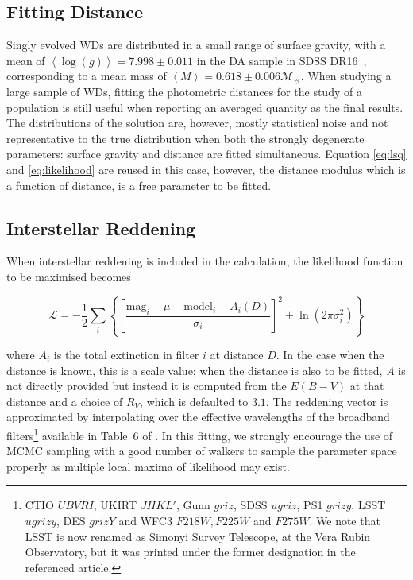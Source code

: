 \documentclass[fleqn,usenatbib]{rasti}
\newcommand{\msun}{\mathcal{M}_{\sun}}
\begin{document}
\subsection{Fitting Distance}
Singly evolved WDs are distributed in a small range of surface gravity, with a
mean of $\left<\log(g)\right> = 7.998 \pm 0.011$ in the DA sample in SDSS
DR16~\citep{2021MNRAS.507.4646K}, corresponding to a mean mass of
$\left<M\right> = 0.618 \pm 0.006 \msun$. When studying a large sample of WDs,
fitting the photometric distances for the study of a population is still
useful when reporting an averaged quantity as the final results. The
distributions of the solution are, however, mostly statistical noise and not
representative to the true distribution when both the strongly degenerate
parameters: surface gravity and distance are fitted simultaneous. Equation
\ref{eq:lsq} and \ref{eq:likelihood} are reused in this case, however, the
distance modulus which is a function of distance, is a free parameter to be
fitted.

\subsection{Interstellar Reddening}
When interstellar reddening is included in the calculation, the likelihood
function to be maximised becomes

\begin{equation}
    \mathcal{L} = -\dfrac{1}{2} \sum_{i} \left\{ \left[ \dfrac{\mathrm{mag}_i - \mu - \mathrm{model}_i - A_i(D)}{\sigma_i} \right]^2 + \ln(2\pi\sigma_i^2) \right\}
\end{equation}

where $A_i$ is the total extinction in filter $i$ at distance $D$. In the case
when the distance is known, this is a scale value; when the distance is also
to be fitted, $A$ is not directly provided but instead it is computed from the
$E(B-V)$ at that distance and a choice of $R_{V}$, which is defaulted to $3.1$.
The reddening vector is approximated by interpolating over the effective
wavelengths of the broadband filters\footnote{CTIO $UBVRI$, UKIRT $JHKL'$,
Gunn $griz$, SDSS $ugriz$, PS1 $grizy$, LSST $ugrizy$, DES $grizY$ and
WFC3 $F218W, F225W$ and $F275W$. We note that LSST is now renamed as
Simonyi Survey Telescope, at the Vera Rubin Observatory, but it was printed
under the former designation in the referenced article.} available in Table~6 of
\citet{2011ApJ...737..103S}. In this fitting, we strongly encourage the use of
MCMC sampling with a good number of walkers to sample the parameter space
properly as multiple local maxima of likelihood may exist.
\end{document}
